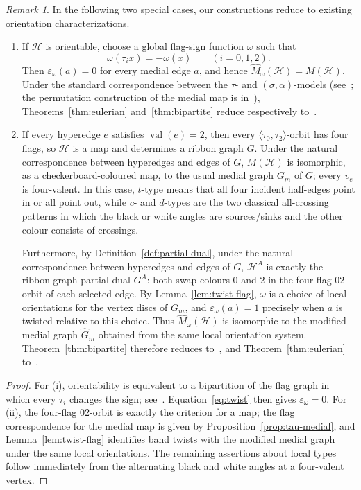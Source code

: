 \documentclass[10pt,a4paper]{article}
\theoremstyle{definition}
\theoremstyle{remark}
\newtheorem{remark}[theorem]{Remark}
\newcommand{\Hcal}{\mathcal{H}}
\newcommand{\val}{\operatorname{val}}
\begin{document}
\begin{remark}\label{prop:specializations}
In the following two special cases, our constructions reduce to existing orientation characterizations.
\begin{enumerate}[label=\textup{(\roman*)}]
\item If $\Hcal$ is orientable, choose a global flag-sign function $\omega$ such that
\[
 \omega(\tau_i x)=-\omega(x)\qquad(i=0,1,2).
\]
Then $\varepsilon_\omega(a)=0$ for every medial edge $a$, and hence $\widehat M_\omega(\Hcal)=M(\Hcal)$. Under the standard correspondence between the $\tau$- and $(\sigma,\alpha)$-models (see~\cite[Section~1.3 and Theorem~2.4]{ChmutovVignes2022}; the permutation construction of the medial map is in~\cite[Definition~3.1]{CoriHetyei2025}), Theorems~\ref{thm:eulerian} and~\ref{thm:bipartite} reduce respectively to~\cite[Theorems~5.3 and~6.5]{HanMetsidik2026}.

\item If every hyperedge $e$ satisfies $\val(e)=2$, then every $\langle\tau_0,\tau_2\rangle$-orbit has four flags, so $\Hcal$ is a map and determines a ribbon graph $G$. Under the natural correspondence between hyperedges and edges of $G$, $M(\Hcal)$ is isomorphic, as a checkerboard-coloured map, to the usual medial graph $G_m$ of $G$; every $v_e$ is four-valent. In this case, $t$-type means that all four incident half-edges point in or all point out, while $c$- and $d$-types are the two classical all-crossing patterns in which the black or white angles are sources/sinks and the other colour consists of crossings.

Furthermore, by Definition~\ref{def:partial-dual}, under the natural correspondence between hyperedges and edges of $G$, $\Hcal^A$ is exactly the ribbon-graph partial dual $G^A$: both swap colours $0$ and $2$ in the four-flag $02$-orbit of each selected edge. By Lemma~\ref{lem:twist-flag}, $\omega$ is a choice of local orientations for the vertex discs of $G_m$, and $\varepsilon_\omega(a)=1$ precisely when $a$ is twisted relative to this choice. Thus $\widehat M_\omega(\Hcal)$ is isomorphic to the modified medial graph $\widehat G_m$ obtained from the same local orientation system. Theorem~\ref{thm:bipartite} therefore reduces to~\cite[Theorem~1.4]{DengJinMetsidik2020}, and Theorem~\ref{thm:eulerian} to~\cite[Theorem~1.5]{DengJinMetsidik2020}.
\end{enumerate}
\end{remark}

\begin{proof}
For (i), orientability is equivalent to a bipartition of the flag graph in which every $\tau_i$ changes the sign; see~\cite[Section~1.3]{ChmutovVignes2022}. Equation~\eqref{eq:twist} then gives $\varepsilon_\omega=0$. For (ii), the four-flag $02$-orbit is exactly the criterion for a map; the flag correspondence for the medial map is given by Proposition~\ref{prop:tau-medial}, and Lemma~\ref{lem:twist-flag} identifies band twists with the modified medial graph under the same local orientations. The remaining assertions about local types follow immediately from the alternating black and white angles at a four-valent vertex.
\end{proof}
\end{document}
